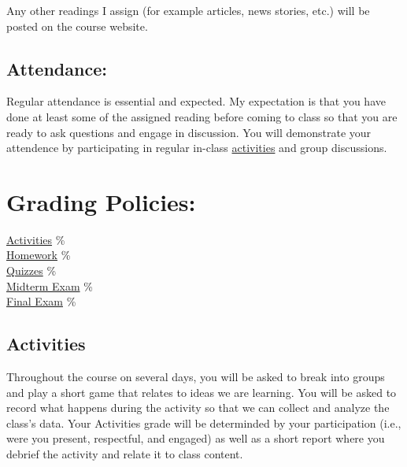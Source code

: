\noindent Any other readings I assign (for example articles, news stories, etc.) will be posted on the course website.

 \hypertarget{attendance policy}{\subsection{Attendance:}}

  Regular attendance is essential and expected.
  My expectation is that you have done at least some of the assigned reading before coming to class so that you are ready to ask questions and engage in discussion.
  You will demonstrate your attendence by participating in regular in-class \hyperlink{grade:activity}{activities} and group discussions.

\section{Grading Policies:} 

\begin{center}\begin{minipage}{3.8in}\begin{flushleft}
    \hyperlink{grade:activity}{Activities} \% \\
    \hyperlink{grade:HW}{Homework}         \% \\
    \hyperlink{grade:quiz}{Quizzes}        \% \\
    \hyperlink{grade:exam}{Midterm Exam}   \% \\
    \hyperlink{grade:exam}{Final Exam}     \% \\
\end{flushleft}\end{minipage}\end{center}

  \hypertarget{grade:activity}{\subsection{Activities}}

  Throughout the course on several days, you will be asked to break into groups and play a short game that relates to ideas we are learning.
  You will be asked to record what happens during the activity so that we can collect and analyze the class's data.
  Your Activities grade will be determinded by your participation (i.e., were you present, respectful, and engaged)
  as well as a short report where you debrief the activity and relate it to class content.

